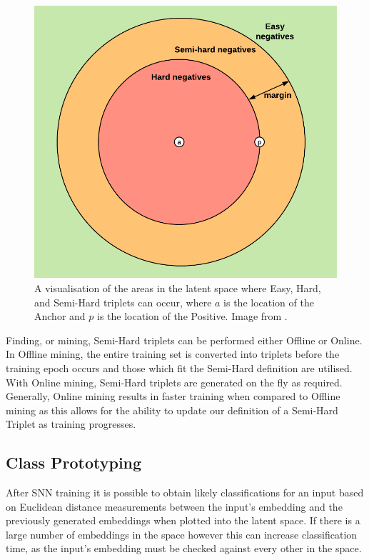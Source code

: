 \begin{figure}
	\begin{center}
		\includegraphics[scale=0.7]{Chapter5/figs/semi-hard-triplet-mining.png}
	\end{center}
	\caption{A visualisation of the areas in the latent space where Easy, Hard, and Semi-Hard triplets can occur, where $a$ is the location of the Anchor and $p$ is the location of the Positive. Image from \cite{moindrot_triplet_2018}.}
	\label{fig:semi-hard-triplet-mining}
\end{figure}

Finding, or mining, Semi-Hard triplets can be performed either Offline or Online. In Offline mining, the entire training set is converted into triplets before the training epoch occurs and those which fit the Semi-Hard definition are utilised. With Online mining, Semi-Hard triplets are generated on the fly as required. Generally, Online mining results in faster training when compared to Offline mining as this allows for the ability to update our definition of a Semi-Hard Triplet as training progresses.

\subsection{Class Prototyping}\label{ch:ID,sec:SNNBackground,sub:prototypes}

After SNN training it is possible to obtain likely classifications for an input based on Euclidean distance measurements between the input's embedding and the previously generated embeddings when plotted into the latent space. If there is a large number of embeddings in the space however this can increase classification time, as the input's embedding must be checked against every other in the space. 

